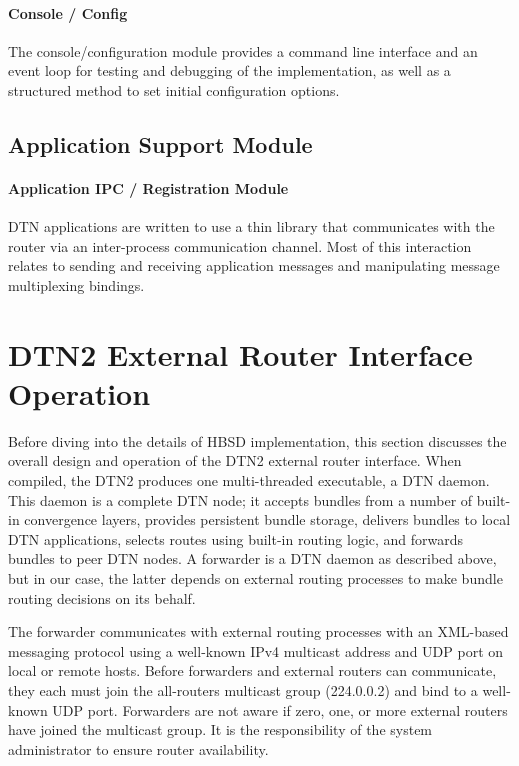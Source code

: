 \paragraph{Console / Config}
The console/configuration module provides a command line interface and an event loop for testing and debugging of the implementation, as well as a structured method
to set initial configuration options. 

\subsection{Application Support Module}

\paragraph{Application IPC / Registration Module}

DTN applications are written to use a thin library that communicates with the router via an inter-process communication channel. Most of this interaction relates to
sending and receiving application messages and manipulating message multiplexing bindings.

\section{DTN2 External Router Interface Operation}

Before diving into the details of HBSD implementation, this section discusses the overall design and operation of the DTN2 external router interface. When compiled, the DTN2 produces one multi-threaded executable, a DTN daemon. This daemon is a complete DTN node; it accepts bundles from a number of built-in convergence layers, provides persistent bundle storage, delivers bundles to local DTN applications, selects routes using built-in routing logic, and forwards bundles to peer DTN nodes. A forwarder is a DTN daemon as described above, but in our case, the latter depends on external routing processes to make bundle routing decisions on its behalf.

The forwarder communicates with external routing processes with an XML-based messaging protocol using a well-known IPv4 multicast address and UDP port on local or remote hosts. Before forwarders and external routers can communicate, they each must join the all-routers multicast group (224.0.0.2) and bind to a well-known UDP port. Forwarders are not aware if zero, one, or more external routers have joined the multicast group. It is the responsibility of the system administrator to ensure router availability.

